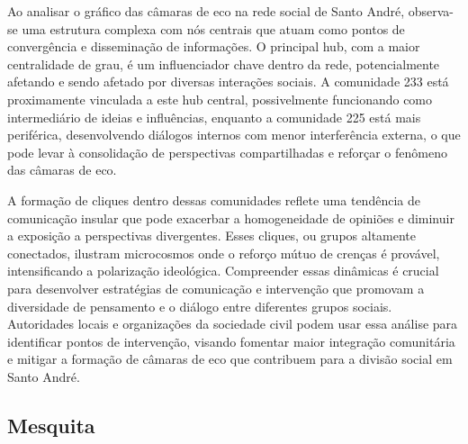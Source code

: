 Ao analisar o gráfico das câmaras de eco na rede social de Santo André, observa-se uma estrutura complexa com nós centrais que atuam como pontos de convergência e disseminação de informações. O principal hub, com a maior centralidade de grau, é um influenciador chave dentro da rede, potencialmente afetando e sendo afetado por diversas interações sociais. A comunidade 233 está proximamente vinculada a este hub central, possivelmente funcionando como intermediário de ideias e influências, enquanto a comunidade 225 está mais periférica, desenvolvendo diálogos internos com menor interferência externa, o que pode levar à consolidação de perspectivas compartilhadas e reforçar o fenômeno das câmaras de eco.

A formação de cliques dentro dessas comunidades reflete uma tendência de comunicação insular que pode exacerbar a homogeneidade de opiniões e diminuir a exposição a perspectivas divergentes. Esses cliques, ou grupos altamente conectados, ilustram microcosmos onde o reforço mútuo de crenças é provável, intensificando a polarização ideológica. Compreender essas dinâmicas é crucial para desenvolver estratégias de comunicação e intervenção que promovam a diversidade de pensamento e o diálogo entre diferentes grupos sociais. Autoridades locais e organizações da sociedade civil podem usar essa análise para identificar pontos de intervenção, visando fomentar maior integração comunitária e mitigar a formação de câmaras de eco que contribuem para a divisão social em Santo André.

\subsection{Mesquita}

